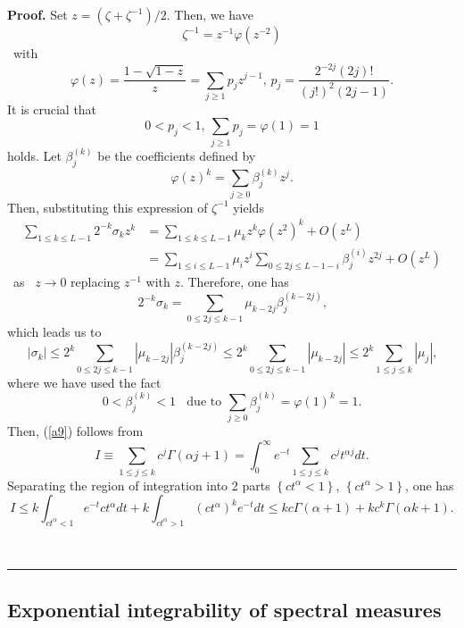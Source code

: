 \documentclass[a4paper]{article}%
\newenvironment{proof}[1][Proof]{\noindent\textbf{#1.} }{\ \rule{0.5em}{0.5em}}
\begin{document}
\begin{proof}
Set $z=\left(  \zeta+\zeta^{-1}\right)  /2$. Then, we have%
\[
\zeta^{-1}=z^{-1}\varphi\left(  z^{-2}\right)
\]
\ with
\[
\varphi\left(  z\right)  =\dfrac{1-\sqrt{1-z}}{z}=\sum_{j\geq1}p_{j}%
z^{j-1}\text{, \ }p_{j}=\dfrac{2^{-2j}\left(  2j\right)  !}{\left(  j!\right)
^{2}\left(  2j-1\right)  }\text{.}%
\]
It is crucial that%
\[
0<p_{j}<1\text{, \ }\sum_{j\geq1}p_{j}=\varphi\left(  1\right)  =1
\]
holds. Let $\beta_{j}^{\left(  k\right)  }$ be the coefficients defined by%
\[
\varphi\left(  z\right)  ^{k}=\sum_{j\geq0}\beta_{j}^{\left(  k\right)  }%
z^{j}\text{.}%
\]
Then, substituting this expression of $\zeta^{-1}$ yields
\begin{align*}
\sum_{1\leq k\leq L-1}2^{-k}\sigma_{k}z^{k}  &  =\sum_{1\leq k\leq L-1}\mu
_{k}z^{k}\varphi\left(  z^{2}\right)  ^{k}+O\left(  z^{L}\right) \\
&  =\sum_{1\leq i\leq L-1}\mu_{i}z^{i}\sum_{0\leq2j\leq L-1-i}\beta
_{j}^{\left(  i\right)  }z^{2j}+O\left(  z^{L}\right)
\end{align*}
\ as \ $z\rightarrow0$ replacing $z^{-1}$ with $z$. Therefore, one has%
\[
2^{-k}\sigma_{k}=\sum_{0\leq2j\leq k-1}\mu_{k-2j}\beta_{j}^{\left(
k-2j\right)  }\text{,}%
\]
which leads us to%
\[
\left\vert \sigma_{k}\right\vert \leq2^{k}\sum_{0\leq2j\leq k-1}\left\vert
\mu_{k-2j}\right\vert \beta_{j}^{\left(  k-2j\right)  }\leq2^{k}\sum
_{0\leq2j\leq k-1}\left\vert \mu_{k-2j}\right\vert \leq2^{k}\sum_{1\leq j\leq
k}\left\vert \mu_{j}\right\vert \text{,}%
\]
where we have used the fact%
\[
0<\beta_{j}^{\left(  k\right)  }<1\text{ }\ \text{due to }\sum_{j\geq0}%
\beta_{j}^{\left(  k\right)  }=\varphi\left(  1\right)  ^{k}=1\text{.}%
\]
Then, (\ref{a9}) follows from%
\[
I\equiv\sum_{1\leq j\leq k}c^{j}\Gamma\left(  \alpha j+1\right)  =\int
_{0}^{\infty}e^{-t}\sum_{1\leq j\leq k}c^{j}t^{\alpha j}dt\text{.}%
\]
Separating the region of integration into 2 parts $\left\{  ct^{\alpha
}<1\right\}  $, $\left\{  ct^{\alpha}>1\right\}  $, one has%
\[
I\leq k\int_{ct^{\alpha}<1}e^{-t}ct^{\alpha}dt+k\int_{ct^{\alpha}>1}\left(
ct^{\alpha}\right)  ^{k}e^{-t}dt\leq kc\Gamma\left(  \alpha+1\right)
+kc^{k}\Gamma\left(  \alpha k+1\right)  \text{.}%
\]

\end{proof}

\subsection{Exponential integrability of spectral measures}
\end{document}
